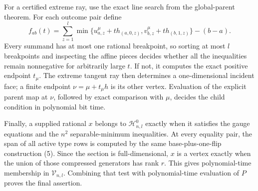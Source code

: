 For a certified extreme ray, use the exact line search from the global-parent theorem. For each outcome pair define
\[f_{ab}(t)=\sum_{z=1}^l\min\{u^\mu_{a,z}+t h_{(a,0,z)},v^\mu_{b,z}+t h_{(b,1,z)}\}-(b-a).\tag{6}\]
Every summand has at most one rational breakpoint, so sorting at most \(l\) breakpoints and inspecting the affine pieces decides whether all the inequalities remain nonnegative for arbitrarily large \(t\). If not, it computes the exact positive endpoint \(t_\mu\). The extreme tangent ray then determines a one-dimensional incident face; a finite endpoint \(\nu=\mu+t_\mu h\) is its other vertex. Evaluation of the explicit parent map at \(\nu\), followed by exact comparison with \(\mu\), decides the child condition in polynomial bit time.

Finally, a supplied rational \(x\) belongs to \(\mathcal H^0_{n,l}\) exactly when it satisfies the gauge equations and the \(n^2\) separable-minimum inequalities. At every equality pair, the span of all active type rows is computed by the same base-plus-one-flip construction (5). Since the section is full-dimensional, \(x\) is a vertex exactly when the union of those compressed generators has rank \(r\). This gives polynomial-time membership in \(\mathcal V_{n,l}\). Combining that test with polynomial-time evaluation of \(P\) proves the final assertion.